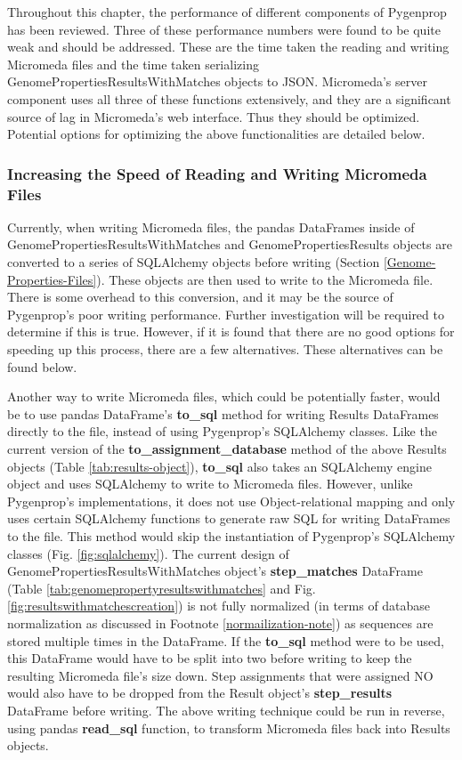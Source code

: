 Throughout this chapter, the performance of different components of Pygenprop has been reviewed. Three of these performance numbers were found to be quite weak and should be addressed. These are the time taken the reading and writing Micromeda files and the time taken serializing GenomePropertiesResultsWithMatches objects to JSON. Micromeda's server component uses all three of these functions extensively, and they are a significant source of lag in Micromeda's web interface. Thus they should be optimized. Potential options for optimizing the above functionalities are detailed below.

\subsubsection{Increasing the Speed of Reading and Writing Micromeda Files} \label{micromeda-file-improvements}

Currently, when writing Micromeda files, the pandas DataFrames inside of GenomePropertiesResultsWithMatches and GenomePropertiesResults objects are converted to a series of SQLAlchemy objects before writing (Section \ref{Genome-Properties-Files}). These objects are then used to write to the Micromeda file. There is some overhead to this conversion, and it may be the source of Pygenprop's poor writing performance. Further investigation will be required to determine if this is true. However, if it is found that there are no good options for speeding up this process, there are a few alternatives. These alternatives can be found below.

Another way to write Micromeda files, which could be potentially faster, would be to use pandas DataFrame's \textbf{to\_sql} method for writing Results DataFrames directly to the file, instead of using Pygenprop's SQLAlchemy classes. Like the current version of the \textbf{to\_assignment\_database} method of the above Results objects (Table \ref{tab:results-object}), \textbf{to\_sql} also takes an SQLAlchemy engine object and uses SQLAlchemy to write to Micromeda files. However, unlike Pygenprop's implementations, it does not use Object-relational mapping \cite{ambler2000mapping} and only uses certain SQLAlchemy functions to generate raw SQL for writing DataFrames to the file. This method would skip the instantiation of Pygenprop's SQLAlchemy classes (Fig. \ref{fig:sqlalchemy}). The current design of GenomePropertiesResultsWithMatches object's \textbf{step\_matches} DataFrame (Table \ref{tab:genomepropertyresultswithmatches} and Fig. \ref{fig:resultswithmatchescreation}) is not fully normalized (in terms of database normalization as discussed in Footnote \ref{normailization-note}) as sequences are stored multiple times in the DataFrame. If the  \textbf{to\_sql} method were to be used, this DataFrame would have to be split into two before writing to keep the resulting Micromeda file's size down. Step assignments that were assigned NO would also have to be dropped from the Result object's \textbf{step\_results} DataFrame before writing. The above writing technique could be run in reverse, using pandas \textbf{read\_sql} function, to transform Micromeda files back into Results objects.

